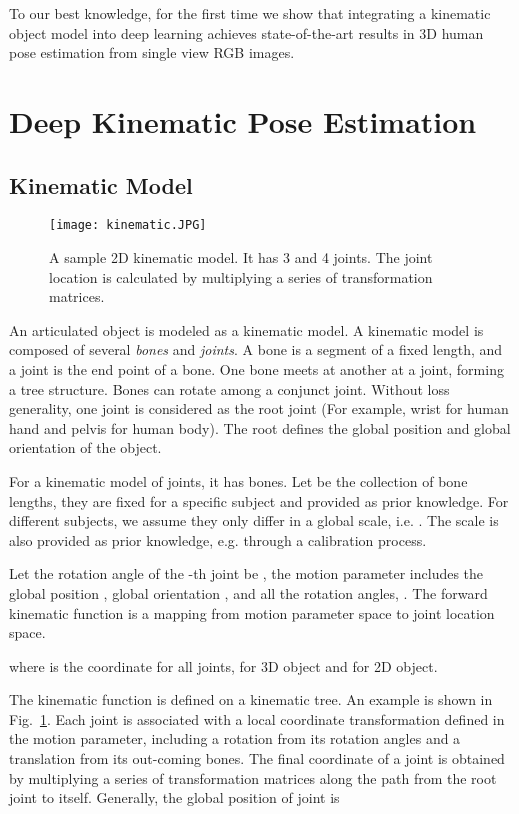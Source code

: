 \documentclass[runningheads]{llncs}
\begin{document}
To our best knowledge, for the first time we show that integrating a kinematic object model into deep learning achieves state-of-the-art results in 3D human pose estimation from single view RGB images.

\section{Deep Kinematic Pose Estimation}
\subsection{Kinematic Model}

\begin{figure}
\begin{center}
\texttt{[image: kinematic.JPG]}
\end{center}
   \caption{A sample 2D kinematic model. It has 3 and 4 joints. The joint location is calculated by multiplying a series of transformation matrices.}
\label{fig:kinematic}
\end{figure}

An articulated object is modeled as a kinematic model. A kinematic model is composed of several \emph{bones} and \emph{joints}. A bone is a segment of a fixed length, and a joint is the end point of a bone. One bone meets at another at a joint, forming a tree structure. Bones can rotate among a conjunct joint. Without loss generality, one joint is considered as the root joint (For example, wrist for human hand and pelvis for human body). The root defines the global position and global orientation of the object.

For a kinematic model of  joints, it has  bones. Let  be the collection of bone lengths, they are fixed for a specific subject and provided as prior knowledge. For different subjects, we assume they only differ in a global scale, i.e. . The scale is also provided as prior knowledge, e.g. through a calibration process.


Let the rotation angle of the -th joint be , the motion parameter  includes the global position , global orientation , and all the rotation angles, . The forward kinematic function is a mapping from motion parameter space to joint location space.

where  is the coordinate for all joints,  for 3D object and  for 2D object.

The kinematic function is defined on a kinematic tree. An example is shown in Fig.~\ref{fig:kinematic}. Each joint is associated with a local coordinate transformation defined in the motion parameter, including a rotation from its rotation angles and a translation from its out-coming bones. The final coordinate of a joint is obtained by multiplying a series of transformation matrices along the path from the root joint to itself. Generally, the global position of joint  is
\end{document}
